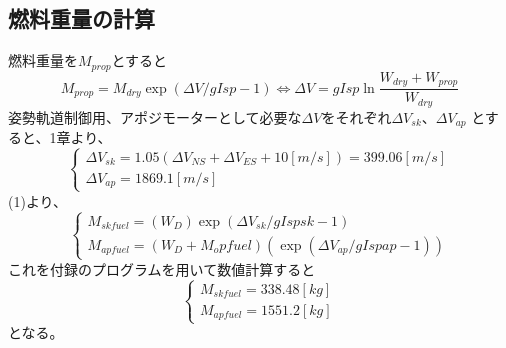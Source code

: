  \subsection{燃料重量の計算}
 燃料重量を$M_{prop}$とすると
 \begin{equation}
   M_{prop} = M_{dry} \exp ( \Delta V/gIsp - 1)
   \Leftrightarrow \Delta V = gIsp \ln{\frac{W_{dry} + W_{prop}}{W_{dry}}}
 \end{equation}
姿勢軌道制御用、アポジモーターとして必要な$\Delta V$をそれぞれ$\Delta V_{sk}、\Delta V_{ap}$
とすると、1章より、
\begin{equation}
  \begin{cases}
    \Delta V_{sk} = 1.05(\Delta V_{NS} + \Delta V_{ES} + 10[m/s]) = 399.06[m/s] \\
    \Delta V_{ap} = 1869.1[m/s]
  \end{cases}
\end{equation}
(1)より、
\begin{equation}
  \begin{cases}
    M_{skfuel} = (W_D) \exp ( \Delta V_{sk}/gIspsk - 1) \\
    M_{apfuel} = (W_D + M_opfuel)(\exp ( \Delta V_{ap}/gIspap - 1))
  \end{cases}
\end{equation}
これを付録のプログラムを用いて数値計算すると
\begin{equation}
  \begin{cases}
    M_{skfuel} = 338.48[kg] \\
    M_{apfuel} = 1551.2[kg]
  \end{cases}
\end{equation}
となる。

